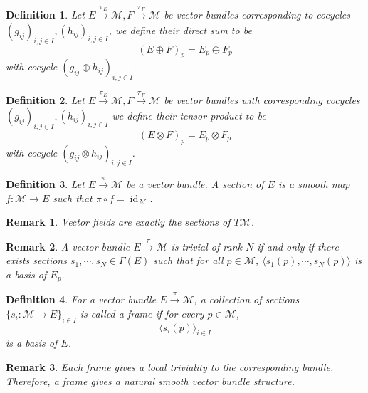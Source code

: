 \documentclass[8pt]{article}
\newtheorem{definition}{Definition}[section]
\newtheorem{remark}{Remark}[section]
\DeclareMathOperator{\id}{id}
\newcommand{\M}[0]{\mathcal{M}}
\begin{document}
\begin{definition}
  Let $E\stackrel{\pi_E}{\to}\M,F\stackrel{\pi_F}{\to}\M$ be vector bundles corresponding to cocycles $(g_{ij})_{i,j\in I},(h_{ij})_{i,j\in I}$, we define their direct sum to be 
  \begin{equation*}
    (E\oplus F)_p = E_p\oplus F_p
  \end{equation*}
  with cocycle $(g_{ij}\oplus h_{ij})_{i,j\in I}$. 
\end{definition}

\begin{definition}
  Let $E\stackrel{\pi_E}{\to}\M,F\stackrel{\pi_F}{\to}\M$ be vector bundles with corresponding cocycles $(g_{ij})_{i,j\in I},(h_{ij})_{i,j\in I}$ we define their tensor product to be 
  \begin{equation*}
    (E\otimes F)_p = E_p\otimes F_p
  \end{equation*}
  with cocycle $(g_{ij}\otimes h_{ij})_{i,j\in I}$. 
\end{definition}

\begin{definition}
  Let $E\stackrel{\pi}{\to}\M$ be a vector bundle. A section of $E$ is a smooth map $f:\M\to E$ such that $\pi\circ f = \id_\M$.
\end{definition}

\begin{remark}
  Vector fields are exactly the sections of $T\M$.
\end{remark}

\begin{remark}
  \label{remark_8_1}
  A vector bundle $E\stackrel{\pi}{\to}\M$ is trivial of rank $N$ if and only if there exists sections $s_1,\cdots,s_N\in\Gamma(E)$ such that for all $p\in \M$, $\langle s_1(p),\cdots,s_N(p)\rangle$ is a basis of $E_p$.
\end{remark}

\begin{definition}
  For a vector bundle $E\stackrel{\pi}{\to}\M$, a collection of sections $\{s_i:\M\to E\}_{i\in I}$ is called a frame if for every $p\in \M$, 
  \begin{equation*}
    \langle s_i(p)\rangle_{i\in I}
  \end{equation*}
  is a basis of $E$.
\end{definition}

\begin{remark}
  Each frame gives a local triviality to the corresponding bundle. Therefore, a frame gives a natural smooth vector bundle structure.
\end{remark}
\end{document}
